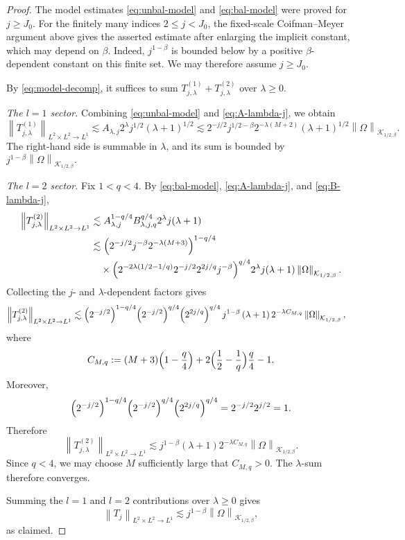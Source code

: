 \documentclass[11pt]{amsart}
\theoremstyle{remark}
\numberwithin{equation}{section}
\newcommand{\cK}{\mathcal K}
\newcommand{\norm}[1]{\left\lVert #1\right\rVert}
\begin{document}
	\begin{proof}
		The model estimates \eqref{eq:unbal-model} and \eqref{eq:bal-model} were
		proved for \(j\ge J_0\). For the finitely many indices \(2\le j<J_0\), the
		fixed-scale Coifman--Meyer argument above gives the asserted estimate after
		enlarging the implicit constant, which may depend on \(\beta\). Indeed,
		\(j^{1-\beta}\) is bounded below by a positive \(\beta\)-dependent constant
		on this finite set. We may therefore assume \(j\ge J_0\).
		
		By \eqref{eq:model-decomp}, it suffices to sum
		\(T_{j,\lambda}^{(1)}+T_{j,\lambda}^{(2)}\) over \(\lambda\ge0\).
		
		\smallskip
		\noindent\emph{The \(l=1\) sector.}
		Combining \eqref{eq:unbal-model} and \eqref{eq:A-lambda-j}, we obtain
		\[
		\norm{T_{j,\lambda}^{(1)}}_{L^2\times L^2\to L^1}
		\lesssim
		A_{\lambda,j}2^\lambda j^{1/2}(\lambda+1)^{1/2}
		\lesssim
		2^{-j/2}j^{1/2-\beta}2^{-\lambda(M+2)}(\lambda+1)^{1/2}
		\norm{\Omega}_{\cK_{1/2,\beta}}.
		\]
		The right-hand side is summable in \(\lambda\), and its sum is bounded by
		\(j^{1-\beta}\norm{\Omega}_{\cK_{1/2,\beta}}\).
		
		\smallskip
		\noindent\emph{The \(l=2\) sector.}
		Fix \(1<q<4\). By \eqref{eq:bal-model}, \eqref{eq:A-lambda-j}, and
		\eqref{eq:B-lambda-j},
		\begin{align*}
			\norm{T_{j,\lambda}^{(2)}}_{L^2\times L^2\to L^1}
			&\lesssim
			A_{\lambda,j}^{1-q/4}B_{\lambda,j,q}^{q/4}2^\lambda j(\lambda+1)
			\\
			&\lesssim
			\Bigl(2^{-j/2}j^{-\beta}2^{-\lambda(M+3)}\Bigr)^{1-q/4}
			\\
			&\quad\times
			\Bigl(2^{-2\lambda(1/2-1/q)}
			2^{-j/2}2^{2j/q}j^{-\beta}\Bigr)^{q/4}
			2^\lambda j(\lambda+1)
			\norm{\Omega}_{\cK_{1/2,\beta}}.
		\end{align*}
		Collecting the \(j\)- and \(\lambda\)-dependent factors gives
		\begin{align*}
			\norm{T_{j,\lambda}^{(2)}}_{L^2\times L^2\to L^1}
			&\lesssim
			\Bigl(2^{-j/2}\Bigr)^{1-q/4}
			\Bigl(2^{-j/2}\Bigr)^{q/4}
			\Bigl(2^{2j/q}\Bigr)^{q/4}
			\,j^{1-\beta}
			\,(\lambda+1)\,
			2^{-\lambda C_{M,q}}
			\norm{\Omega}_{\cK_{1/2,\beta}},
		\end{align*}
		where
		\[
		C_{M,q}:=(M+3)\Bigl(1-\frac q4\Bigr)+2\Bigl(\frac12-\frac1q\Bigr)\frac q4-1.
		\]
		Moreover,
		\[
		\Bigl(2^{-j/2}\Bigr)^{1-q/4}
		\Bigl(2^{-j/2}\Bigr)^{q/4}
		\Bigl(2^{2j/q}\Bigr)^{q/4}
		=2^{-j/2}2^{j/2}=1.
		\]
		Therefore
		\[
		\norm{T_{j,\lambda}^{(2)}}_{L^2\times L^2\to L^1}
		\lesssim
		j^{1-\beta}(\lambda+1)2^{-\lambda C_{M,q}}
		\norm{\Omega}_{\cK_{1/2,\beta}}.
		\]
		Since \(q<4\), we may choose \(M\) sufficiently large that \(C_{M,q}>0\).
		The \(\lambda\)-sum therefore converges.
		
		Summing the \(l=1\) and \(l=2\) contributions over \(\lambda\ge0\) gives
		\[
		\norm{T_j}_{L^2\times L^2\to L^1}
		\lesssim
		j^{1-\beta}\norm{\Omega}_{\cK_{1/2,\beta}},
		\]
		as claimed.
	\end{proof}
	
\end{document}

